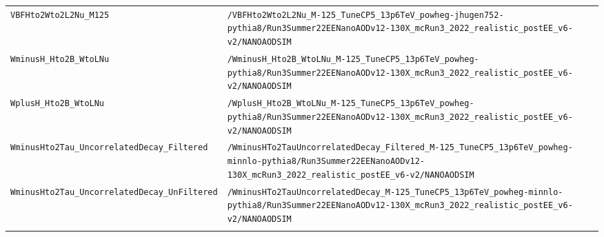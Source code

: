\begin{longtable}{@{}>{\RaggedRight\arraybackslash}p{} >{\RaggedRight\arraybackslash}p{}@{}}
\addlinespace[2pt]
\texttt{VBFHto2Wto2L2Nu\_\allowbreak{}M125} & \texttt{/\allowbreak{}VBFHto2Wto2L2Nu\_\allowbreak{}M-\allowbreak{}125\_\allowbreak{}TuneCP5\_\allowbreak{}13p6TeV\_\allowbreak{}powheg-\allowbreak{}jhugen752-\allowbreak{}pythia8/\allowbreak{}Run3Summer22EENanoAODv12-\allowbreak{}130X\_\allowbreak{}mcRun3\_\allowbreak{}2022\_\allowbreak{}realistic\_\allowbreak{}postEE\_\allowbreak{}v6-\allowbreak{}v2/\allowbreak{}NANOAODSIM} \\
\addlinespace[2pt]
\texttt{WminusH\_\allowbreak{}Hto2B\_\allowbreak{}WtoLNu} & \texttt{/\allowbreak{}WminusH\_\allowbreak{}Hto2B\_\allowbreak{}WtoLNu\_\allowbreak{}M-\allowbreak{}125\_\allowbreak{}TuneCP5\_\allowbreak{}13p6TeV\_\allowbreak{}powheg-\allowbreak{}pythia8/\allowbreak{}Run3Summer22EENanoAODv12-\allowbreak{}130X\_\allowbreak{}mcRun3\_\allowbreak{}2022\_\allowbreak{}realistic\_\allowbreak{}postEE\_\allowbreak{}v6-\allowbreak{}v2/\allowbreak{}NANOAODSIM} \\
\addlinespace[2pt]
\texttt{WplusH\_\allowbreak{}Hto2B\_\allowbreak{}WtoLNu} & \texttt{/\allowbreak{}WplusH\_\allowbreak{}Hto2B\_\allowbreak{}WtoLNu\_\allowbreak{}M-\allowbreak{}125\_\allowbreak{}TuneCP5\_\allowbreak{}13p6TeV\_\allowbreak{}powheg-\allowbreak{}pythia8/\allowbreak{}Run3Summer22EENanoAODv12-\allowbreak{}130X\_\allowbreak{}mcRun3\_\allowbreak{}2022\_\allowbreak{}realistic\_\allowbreak{}postEE\_\allowbreak{}v6-\allowbreak{}v2/\allowbreak{}NANOAODSIM} \\
\addlinespace[2pt]
\texttt{WminusHto2Tau\_\allowbreak{}UncorrelatedDecay\_\allowbreak{}Filtered} & \texttt{/\allowbreak{}WminusHTo2TauUncorrelatedDecay\_\allowbreak{}Filtered\_\allowbreak{}M-\allowbreak{}125\_\allowbreak{}TuneCP5\_\allowbreak{}13p6TeV\_\allowbreak{}powheg-\allowbreak{}minnlo-\allowbreak{}pythia8/\allowbreak{}Run3Summer22EENanoAODv12-\allowbreak{}130X\_\allowbreak{}mcRun3\_\allowbreak{}2022\_\allowbreak{}realistic\_\allowbreak{}postEE\_\allowbreak{}v6-\allowbreak{}v2/\allowbreak{}NANOAODSIM} \\
\addlinespace[2pt]
\texttt{WminusHto2Tau\_\allowbreak{}UncorrelatedDecay\_\allowbreak{}UnFiltered} & \texttt{/\allowbreak{}WminusHTo2TauUncorrelatedDecay\_\allowbreak{}M-\allowbreak{}125\_\allowbreak{}TuneCP5\_\allowbreak{}13p6TeV\_\allowbreak{}powheg-\allowbreak{}minnlo-\allowbreak{}pythia8/\allowbreak{}Run3Summer22EENanoAODv12-\allowbreak{}130X\_\allowbreak{}mcRun3\_\allowbreak{}2022\_\allowbreak{}realistic\_\allowbreak{}postEE\_\allowbreak{}v6-\allowbreak{}v2/\allowbreak{}NANOAODSIM} \\
\addlinespace[2pt]

\end{longtable}
